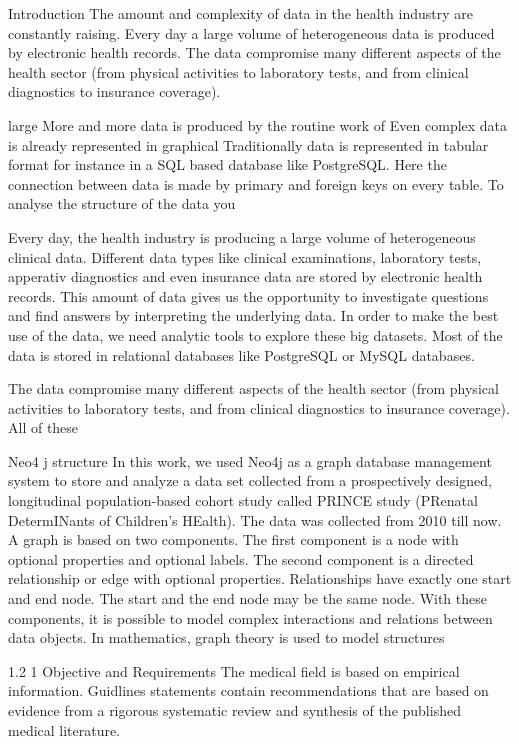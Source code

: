 Introduction
The amount and complexity of data in the health industry are constantly raising. Every day a large volume of heterogeneous data is produced by electronic health records. The data compromise many different aspects of the health sector (from physical activities to laboratory tests, and from clinical diagnostics to insurance coverage).


 large More and more data is produced by the routine work of Even complex data is already represented in graphical 
Traditionally data is represented in tabular format for instance in a SQL based database like PostgreSQL. Here the connection between data is made by primary and foreign keys on every table. To analyse the structure of the data you 

Every day, the health industry is producing a large volume of heterogeneous clinical data. Different data types like clinical examinations, laboratory tests, apperativ diagnostics and even insurance data are stored by electronic health records. This amount of data gives us the opportunity to investigate questions and find answers by interpreting the underlying data. In order to make the best use of the data, we need analytic tools to explore these big datasets. Most of the data is stored in relational databases like PostgreSQL or MySQL databases.



The data compromise many different aspects of the health sector (from physical activities to laboratory tests, and from clinical diagnostics to insurance coverage). All of these 

Neo4 j structure
In this work, we used Neo4j as a graph database management system to store and analyze a data set collected from a prospectively designed, longitudinal population-based cohort study called PRINCE study (PRenatal DetermINants of Children’s HEalth). The data was collected from 2010 till now.
A graph is based on two components. The first component is a node with optional properties and optional labels. The second component is a directed relationship or edge with optional properties. Relationships have exactly one start and end node. The start and the end node may be the same node. With these components, it is possible to model complex interactions and relations between data objects. In mathematics, graph theory is used to model structures 

1.2 1 Objective and Requirements
The medical field is based on empirical information. Guidlines statements contain recommendations that are based on evidence from a rigorous systematic review and synthesis of the published medical literature.

